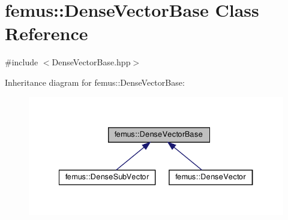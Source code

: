 \hypertarget{classfemus_1_1_dense_vector_base}{}\section{femus\+:\+:Dense\+Vector\+Base Class Reference}
\label{classfemus_1_1_dense_vector_base}


{\ttfamily \#include $<$Dense\+Vector\+Base.\+hpp$>$}



Inheritance diagram for femus\+:\+:Dense\+Vector\+Base\+:
\nopagebreak
\begin{figure}[H]
\begin{center}
\leavevmode
\includegraphics[width=334pt]{classfemus_1_1_dense_vector_base__inherit__graph}
\end{center}
\end{figure}
